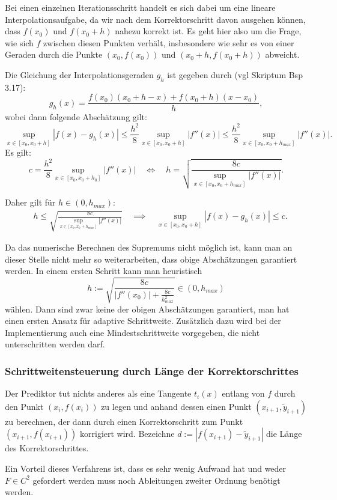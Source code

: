 \documentclass[a4paper,11pt,bibliography=totoc,listof=totoc,headinclude=true,cleardoublepage=empty,oneside]{scrartcl}
\newcounter{satz}
\begin{document}
Bei einen einzelnen Iterationsschritt handelt es sich dabei um eine lineare Interpolationsaufgabe, da wir nach dem Korrektorschritt davon ausgehen können, dass $f(x_0)$ und $f(x_0+h)$ nahezu korrekt ist. Es geht hier also um die Frage, wie sich $f$ zwischen diesen Punkten verhält, insbesondere wie sehr es von einer Geraden durch die Punkte $(x_0,f(x_0))$ und $(x_0+h,f(x_0+h))$ abweicht.

 Die Gleichung der Interpolationsgeraden $g_h$ ist gegeben durch (vgl Skriptum Bsp 3.17):
\[
g_h (x) = \frac{f(x_0)(x_0+h-x) + f(x_0+h)(x-x_0)}{h},
\]
wobei dann folgende Abschätzung gilt:
\[
\sup_{x \in [x_0,x_0+h]} |f(x)-g_h(x)|  \le \frac{h^2}{8} \sup_{x \in [x_0,x_0+h]} |f''(x)| \le \frac{h^2}{8} \sup_{x \in [x_0,x_0+h_{max}]} |f''(x)|.
\]
Es gilt:
\[
c = \frac{h^2}{8} \sup_{x \in [x_0,x_0+h_0]} |f''(x)| \quad \iff \quad h = \sqrt{ \frac{8c}{\sup_{x \in [x_0,x_0+h_{max}]} |f''(x)|}}.
\]

Daher gilt für $h \in (0,h_{max})$:
\begin{align}\label{eq:absch_h}
\quad h \le \sqrt{ \frac{8c}{\sup_{x \in [x_0,x_0+h_{max}]} |f''(x)|}} \quad \implies \quad \sup_{x \in [x_0,x_0+h]} |f(x)-g_h(x)| \le c.
\end{align}

Da das numerische Berechnen des Supremums nicht möglich ist, kann man an dieser Stelle nicht mehr so weiterarbeiten, dass obige Abschätzungen garantiert werden. In einem ersten Schritt kann man heuristisch
\[
h := \sqrt{\frac{8c}{|f''(x_0)| +\frac{8c}{h_{max}^2} }} \in (0,h_{max})
\]
wählen. Dann sind zwar keine der obigen Abschätzungen garantiert, man hat einen ersten Ansatz für adaptive Schrittweite. Zusätzlich dazu wird bei der Implementierung auch eine Mindestschrittweite vorgegeben, die nicht unterschritten werden darf. 


\subsubsection{Schrittweitensteuerung durch Länge der Korrektorschrittes}\label{chap:5.1.3}
Der Prediktor tut nichts anderes als eine Tangente $t_i(x)$ entlang von $f$ durch den Punkt $(x_i,f(x_i))$ zu legen und anhand dessen einen Punkt $(x_{i+1},\tilde{y}_{i+1})$ zu berechnen, der dann durch einen Korrektorschritt zum Punkt $(x_{i+1},f(x_{i+1}))$ korrigiert wird. Bezeichne $d:= |f(x_{i+1})-\tilde{y}_{i+1}|$ die Länge des Korrektorschrittes. 

Ein Vorteil dieses Verfahrens ist, dass es sehr wenig Aufwand hat und weder $F \in C^2$ gefordert werden muss noch Ableitungen zweiter Ordnung benötigt werden. 
\end{document}
